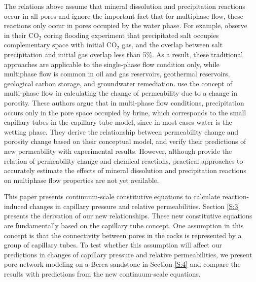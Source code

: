 \documentclass[preprint,12pt,authoryear]{elsarticle}
\begin{document}
The relations above assume that mineral dissolution and precipitation reactions occur in all pores and ignore the important fact that for multiphase flow, these reactions only occur in pores occupied by the water phase. For example, \cite{ott2015salt} observe in their CO$_2$ coring flooding experiment that precipitated salt occupies complementary space with initial CO$_2$ gas, and the overlap between salt precipitation and initial gas overlap less than 5\%. As a result, these traditional approaches are applicable to the single-phase flow condition only, while multiphase flow is common in oil and gas reservoirs, geothermal reservoirs, geological carbon storage, and groundwater remediation. \cite{liu2013permeability} use the concept of multi-phase flow in calculating the change of permeability due to a change in porosity. These authors argue that in multi-phase flow conditions, precipitation occurs only in the pore space occupied by brine, which corresponds to the small capillary tubes in the capillary tube model, since in most cases water is the wetting phase. They derive the relationship between permeability change and porosity change based on their conceptual model, and verify their predictions of new permeability with experimental results. However, although \citet{liu2013permeability} provide the relation of permeability change and chemical reactions, practical approaches to accurately estimate the effects of mineral dissolution and precipitation reactions on multiphase flow properties are not yet available. 

This paper presents continuum-scale constitutive equations to calculate reaction-induced changes in capillary pressure and relative permeabilities. Section \ref{S:3} presents the derivation of our new relationships. These new constitutive equations are fundamentally based on the capillary tube concept. One assumption in this concept is that the connectivity between pores in the rocks is represented by a group of capillary tubes. To test whether this assumption will affect our predictions in changes of capillary pressure and relative permeabilities, we present pore network modeling on a Berea sandstone in Section \ref{S:4} and compare the results with predictions from the new continuum-scale equations. 
\end{document}
